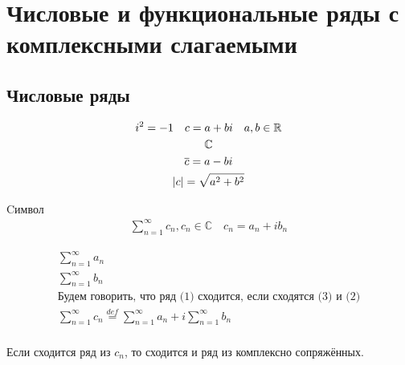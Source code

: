 \documentclass[main]{subfiles}
\begin{document}
\chapter{Числовые и функциональные ряды с комплексными слагаемыми}
\section{Числовые ряды}
\begin{gather*}
    i^2 = -1 \quad c = a + bi \quad a,b \in \mathbb{R} \\
    \mathbb{C}\\
    \overline{c} = a -bi \\
    |c| = \sqrt{a^2 + b^2}
\end{gather*}
\begin{definition}
     Cимвол \begin{gather*}
        \sum_{n=1}^\infty c_n , c_n \in \mathbb{C} \quad c_n = a_n + ib_n \tag{1}
    \end{gather*}
\end{definition}

\begin{definition}[Сходимость]
    \begin{gather*}
    \sum^\infty_{n=1} a_n \tag{2}\\
    \sum^\infty_{n=1} b_n \tag{3}\\
    \text{Будем говорить, что ряд (1) сходится, если сходятся (3) и (2)} \\
    \sum^\infty_{n=1} c_n \stackrel{def}{=} \sum^\infty_{n=1} a_n + i \sum^\infty_{n=1} b_n \tag{4}\\
    \end{gather*}
\end{definition}
Если сходится ряд из $c_n$, то сходится и ряд из комплексно сопряжённых. 
\end{document}
